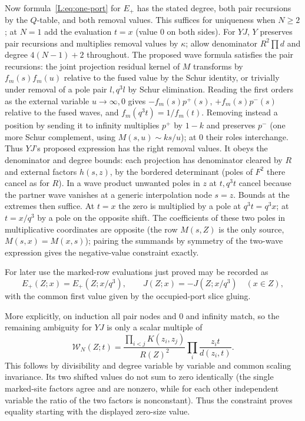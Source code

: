 Now formula~\eqref{L:eq:one-port} for \(E_+\) has the stated degree, both pair recursions by the \(Q\)-table, and both removal values. This suffices for uniqueness when \(N\ge2\); at \(N=1\) add the evaluation \(t=x\) (value 0 on both sides). For \(YJ\), \(Y\) preserves pair recursions and multiplies removal values by \(\kappa\); allow denominator \(R^2\prod d\) and degree \(4(N-1)+2\) throughout. The proposed wave formula satisfies the pair recursions: the joint projection residual kernel of \(M\) transforms by \(f_m(s)f_m(u)\) relative to the fused value by the Schur identity, or trivially under removal of a pole pair \(l,q^3 l\) by Schur elimination. Reading the first orders as the external variable \(u\to\infty,0\) gives \(-f_m(s)p^+(s)\), \(+f_m(s)p^-(s)\) relative to the fused waves, and \(f_m(q^3t)=1/f_m(t)\). Removing instead a position by sending it to infinity multiplies \(p^+\) by \(1-k\) and preserves \(p^-\) (one more Schur complement, using \(M(s,u)\sim k s/u\)); at 0 their roles interchange. Thus \(YJ\)'s proposed expression has the right removal values. It obeys the denominator and degree bounds: each projection has denominator cleared by \(R\) and external factors \(h(s,z)\), by the bordered determinant (poles of \(F^2\) there cancel as for \(R\)). In a wave product unwanted poles in \(z\) at \(t,q^3t\) cancel because the partner wave vanishes at a generic interpolation node \(s=z\). Bounds at the extremes then suffice. At \(t=x\) the zero is multiplied by a pole at \(q^3t=q^3x\); at \(t=x/q^3\) by a pole on the opposite shift. The coefficients of these two poles in multiplicative coordinates are opposite (the row \(M(s,Z)\) is the only source, \(M(s,x)=M(x,s)\)); pairing the summands by symmetry of the two-wave expression gives the negative-value constraint exactly.

For later use the marked-row evaluations just proved may be recorded as
\begin{equation}\label{L:eq:mark-evaluation}
 E_+(Z;x)=E_+(Z;x/q^3),\qquad J(Z;x)=-J(Z;x/q^3)
 \quad(x\in Z),
\end{equation}
with the common first value given by the occupied-port slice gluing.

More explicitly, on induction all pair nodes and 0 and infinity match, so the remaining ambiguity for \(YJ\) is only a scalar multiple of
\[
 \mathcal W_N(Z;t)=\frac{\prod_{i<j}K(z_i,z_j)}{R(Z)^2}
                     \prod_i \frac{z_i t}{d(z_i,t)}.
\]
This follows by divisibility and degree variable by variable and common scaling invariance. Its two shifted values do not sum to zero identically (the single marked-site factors agree and are nonzero, while for each other independent variable the ratio of the two factors is nonconstant). Thus the constraint proves equality starting with the displayed zero-size value.


